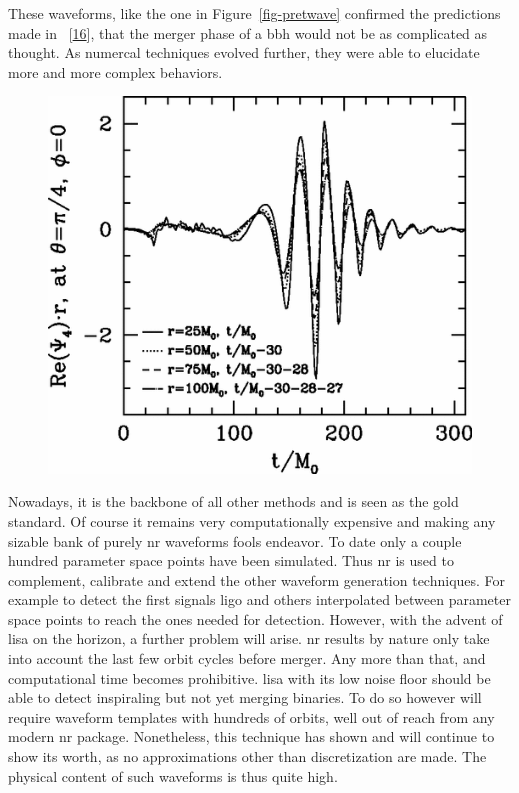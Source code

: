 \documentclass[
  10pt,
  a4paper,
  DIV=11,
  numbers=noendperiod,
  twoside]{scrreprt}
\DeclareRobustCommand{\[}{\begin{equation}}
\DeclareRobustCommand{\]}{\end{equation}}
\begin{document}
These waveforms, like the one in Figure~\ref{fig-pretwave} confirmed the
predictions made in ~{[}\protect\hyperlink{ref-Buonanno:2000ef}{16}{]},
that the merger phase of a \gls{bbh} would not be as complicated as
thought. As numercal techniques evolved further, they were able to
elucidate more and more complex behaviors.

\begin{figure}


{\centering \includegraphics{./pretwave.png}

}

\end{figure}

Nowadays, it is the backbone of all other methods and is seen as the
gold standard. Of course it remains very computationally expensive and
making any sizable bank of purely \gls{nr} waveforms fools endeavor. To
date only a couple hundred parameter space points have been simulated.
Thus \gls{nr} is used to complement, calibrate and extend the other
waveform generation techniques. For example to detect the first signals
\gls{ligo} and others interpolated between parameter space points to
reach the ones needed for detection. However, with the advent of
\gls{lisa} on the horizon, a further problem will arise. \gls{nr}
results by nature only take into account the last few orbit cycles
before merger. Any more than that, and computational time becomes
prohibitive. \gls{lisa} with its low noise floor should be able to
detect inspiraling but not yet merging binaries. To do so however will
require waveform templates with hundreds of orbits, well out of reach
from any modern \gls{nr} package. Nonetheless, this technique has shown
and will continue to show its worth, as no approximations other than
discretization are made. The physical content of such waveforms is thus
quite high.
\end{document}

